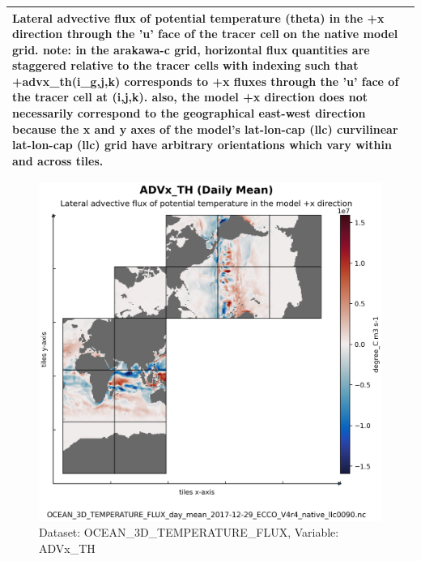 \begin{longtable}{|m{}|m{}|m{}|m{}|}
\multicolumn{4}{|p{1\textwidth}|}{Lateral advective flux of potential temperature (theta) in the +x direction through the 'u' face of the tracer cell on the native model grid. note: in the arakawa-c grid, horizontal flux quantities are staggered relative to the tracer cells with indexing such that +advx\_th(i\_g,j,k) corresponds to +x fluxes through the 'u' face of the tracer cell at (i,j,k). also, the model +x direction does not necessarily correspond to the geographical east-west direction because the x and y axes of the model's lat-lon-cap (llc) curvilinear lat-lon-cap (llc) grid have arbitrary orientations which vary within and across tiles.} \\ \hline
\end{longtable}

\begin{figure}[H]
\centering
\includegraphics[scale=0.55]{../images/plots/native_plots/Ocean_Three-Dimensional_Potential_Temperature_Fluxes/ADVx_TH.png}
\caption{Dataset: OCEAN\_3D\_TEMPERATURE\_FLUX, Variable: ADVx\_TH}
\label{tab:table-OCEAN_3D_TEMPERATURE_FLUX_ADVx_TH-Plot}
\end{figure}
\pagebreak
